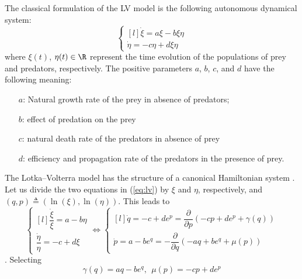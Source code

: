 %
%
\begin{exmp}
    The classical formulation of the LV model is the following autonomous dynamical system:
    \begin{equation}\label{eq:lv}
        \left\{ 
            \begin{matrix*}[l]
                \dot{\xi} = a\xi - b\xi\eta\\
                \dot{\eta} = -c\eta + d\xi\eta
            \end{matrix*}\right.
    \end{equation}
    where $\xi(t)$, $\eta(t)\in\R$ represent the time evolution of the populations of prey and predators, respectively. The positive parameters $a$, $b$, $c$, and $d$ have the following meaning:
    \begin{itemize}
        \item [$a$:] Natural growth rate of the prey in absence of predators;
        \item [$b$:] effect of predation on the prey
        \item [$c$:] natural death rate of the predators in absence of prey
        \item [$d$:] efficiency and propagation rate of the predators in the presence of prey.
    \end{itemize}
    The Lotka--Volterra model has the structure of a canonical Hamiltonian system \citep{vulpiani2010chaos}. 
    Let us divide the two equations in (\ref{eq:lv}) by $\xi$ and $\eta$, respectively, and $(q,p)\triangleq(\ln(\xi),\ln(\eta))$. This leads to
	\begin{equation*}
	    \left\{ 
	        \begin{matrix*}[l]
	            \dfrac{\dot{\xi}}{\xi} = a - b\eta\\
	            \dfrac{\dot{\eta}}{\eta} = -c + d\xi
	        \end{matrix*}\right.
    \Leftrightarrow
    \left\{ 
	\begin{matrix*}[l]
	\dot{q} = -c + de^p = \dfrac{\partial}{\partial p}(-cp+de^p + \gamma(q))\\
	\dot{p} = a - be^q = -\dfrac{\partial}{\partial q}(-aq+be^q + \mu(p))
	\end{matrix*}\right.
	\end{equation*}
	. Selecting 
	\begin{equation}
	    \gamma(q) = aq-be^q,~~ \mu(p) = -cp+de^p   
	\end{equation}

\end{exmp}

